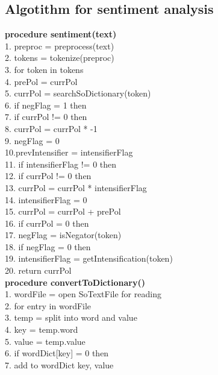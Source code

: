 \subsection{Algotithm for sentiment analysis}
\indent
\textbf{procedure sentiment(text)} \\
1. \indent preproc = preprocess(text) \\
2. \indent tokens = tokenize(preproc) \\
3. \indent for token in tokens  \\
4. \indent \indent prePol = currPol  \\
5. \indent \indent currPol = searchSoDictionary(token)  \\
6. \indent \indent if negFlag = 1 then \\
7. \indent \indent \indent if currPol != 0 then \\
8. \indent \indent \indent \indent currPol = currPol * -1 \\
9. \indent \indent \indent \indent negFlag = 0 \\
10.\indent \indent prevIntensifier = intensifierFlag \\
11. \indent \indent if intensifierFlag != 0 then \\
12. \indent \indent \indent if currPol != 0 then \\
13. \indent \indent \indent \indent currPol = currPol * intensifierFlag \\
14. \indent \indent \indent \indent intensifierFlag = 0 \\
15. \indent \indent currPol = currPol + prePol \\
16. \indent \indent if currPol = 0 then \\
17.	\indent \indent \indent negFlag = isNegator(token)  \\
18. \indent \indent \indent if negFlag = 0 then \\
19. \indent \indent \indent \indent intensifierFlag = getIntensification(token) \\
20. \indent return currPol \\

\textbf{procedure convertToDictionary()} \\
1. \indent wordFile = open SoTextFile for reading \\
2. \indent for entry in wordFile  \\
3. \indent \indent temp = split into word and value \\
4. \indent \indent key = temp.word \\
5. \indent \indent value = temp.value \\
6. \indent \indent if wordDict[key] = 0 then \\
7. \indent \indent \indent add to wordDict key, value \\

